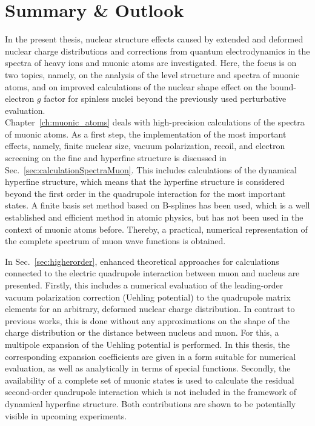 \chapter*{Summary \& Outlook}
\label{ch:conclusion}

In the present thesis, nuclear structure effects caused by extended and deformed nuclear charge distributions and corrections from quantum electrodynamics in the spectra of heavy ions and muonic atoms are investigated. 
Here, the focus is on two topics, namely, on the analysis of the level structure and spectra of muonic atoms, and on improved calculations of the nuclear shape effect on the bound-electron $g$ factor for spinless nuclei beyond the previously used perturbative evaluation.\\[11pt]%
%
Chapter~\ref{ch:muonic_atoms} deals with high-precision calculations of the spectra of muonic atoms. 
As a first step, the implementation of the most important effects, namely, finite nuclear size, vacuum polarization, recoil, and electron screening on the fine and hyperfine structure is discussed in Sec.~\ref{sec:calculationSpectraMuon}.
This includes calculations of the dynamical hyperfine structure, which means that the hyperfine structure is considered beyond the first order in the quadrupole interaction for the most important states.
A finite basis set method based on B-splines has been used, which is a well established and efficient method in atomic physics, but has not been used in the context of muonic atoms before. Thereby, a practical, numerical representation of the complete spectrum of muon wave functions is obtained.

In Sec.~\ref{sec:higherorder}, enhanced theoretical approaches for calculations connected to the electric quadrupole interaction between muon and nucleus are presented. 
Firstly, this includes a numerical evaluation of the leading-order vacuum polarization correction (Uehling potential) to the quadrupole matrix elements for an arbitrary, deformed nuclear charge distribution. In contrast to previous works, this is done without any approximations on the shape of the charge distribution or the distance between nucleus and muon. For this, a multipole expansion of the Uehling potential is performed. In this thesis, the corresponding expansion coefficients are given in a form suitable for numerical evaluation, as well as analytically in terms of special functions.
Secondly, the availability of a complete set of muonic states is used to calculate the residual second-order quadrupole interaction which is not included in the framework of dynamical hyperfine structure. 
Both contributions are shown to be potentially visible in upcoming experiments.

